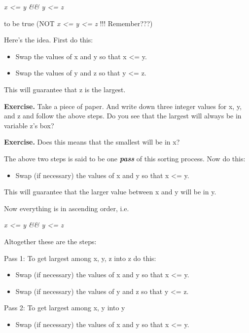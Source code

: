 \documentclass[
]{article}
\providecommand{\tightlist}{%
  \setlength{\itemsep}{0pt}\setlength{\parskip}{0pt}}
\begin{document}
\emph{x \textless= y \&\& y \textless= z}

to be true (NOT \emph{x \textless= y \textless= z} !!! Remember???)

Here's the idea. First do this:

\begin{itemize}
\tightlist
\item
  Swap the values of x and y so that x \textless= y.
\item
  Swap the values of y and z so that y \textless= z.
\end{itemize}

This will guarantee that z is the largest.

\textbf{Exercise.} Take a piece of paper. And write down three integer
values for x, y, and z and follow the above steps. Do you see that the
largest will always be in variable z's box?

\textbf{Exercise.} Does this means that the smallest will be in x?

The above two steps is said to be one \emph{\textbf{pass}} of this
sorting process. Now do this:

\begin{itemize}
\tightlist
\item
  Swap (if necessary) the values of x and y so that x \textless= y.
\end{itemize}

This will guarantee that the larger value between x and y will be in y.

Now everything is in ascending order, i.e.

\emph{x \textless= y \&\& y \textless= z}

Altogether these are the steps:

Pass 1: To get largest among x, y, z into z do this:

\begin{itemize}
\tightlist
\item
  Swap (if necessary) the values of x and y so that x \textless= y.
\item
  Swap (if necessary) the values of y and z so that y \textless= z.
\end{itemize}

Pass 2: To get largest among x, y into y

\begin{itemize}
\tightlist
\item
  Swap (if necessary) the values of x and y so that x \textless= y.
\end{itemize}
\end{document}

